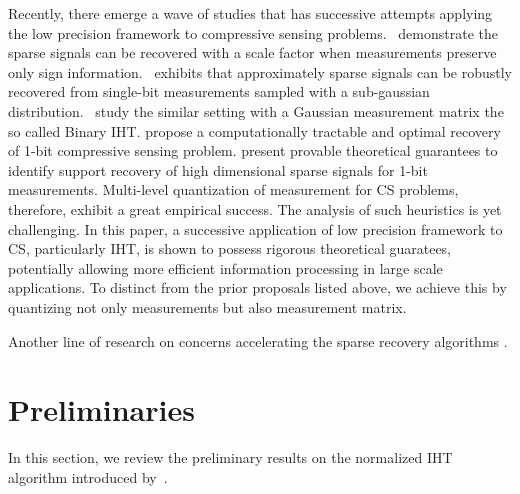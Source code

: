 \documentclass{article}
\begin{document}
Recently, there emerge a wave of studies that has successive attempts applying the low precision framework to compressive sensing problems.~\cite{boufounos20091bitcs} demonstrate the sparse signals can be recovered with a scale factor when measurements preserve only sign information.~\cite{ai20121bitcs, davenport20121bit} exhibits that approximately sparse signals can be robustly recovered from single-bit measurements sampled with a sub-gaussian distribution.~\cite{jacques20111bit, laska20111bitcs} study the similar setting with a Gaussian measurement matrix the so called Binary IHT. \cite{plan20111bitcs, plan20121bitcs} propose a computationally tractable and optimal recovery of 1-bit compressive sensing problem. \cite{recht20121bitcs, gopi20131bitcs} present provable theoretical guarantees to identify support recovery of high dimensional sparse signals for 1-bit measurements. Multi-level quantization of measurement for CS problems, therefore, exhibit a great empirical success. The analysis of such heuristics is yet challenging. In this paper, a successive application of low precision framework to CS, particularly IHT, is shown to possess rigorous theoretical guaratees, potentially allowing more efficient information processing in large scale applications. To distinct from the prior proposals listed above, we achieve this by quantizing not only measurements but also measurement matrix.

Another line of research on concerns accelerating the sparse recovery algorithms \cite{blumensath2011aiht, wei2015fiht, blanchard2013iht, cevher2011ht, liu2017dualiht}. 





























\section{Preliminaries}\label{section_iht}
In this section, we review the preliminary results on the normalized IHT algorithm introduced by~\cite{blumensath2010niht, blumensath2012greedy}.
\end{document}
